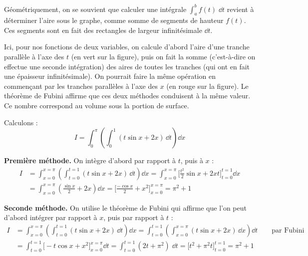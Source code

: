 \documentclass[class=report,crop=false]{standalone}
\begin{document}
Géométriquement, on se souvient que calculer une intégrale $\int_a^b f(t)\;\dd t$
revient à déterminer l'aire sous le graphe, comme somme de segments de hauteur $f(t)$.
Ces segments sont en fait des rectangles de largeur infinitésimale $\dd t$.




Ici, pour nos fonctions de deux variables, on calcule d'abord l'aire d'une 
tranche parallèle à l'axe des $t$ (en vert sur la figure), 
puis on fait la somme (c'est-à-dire on effectue une seconde intégration) 
des aires de toutes les tranches (qui ont en fait une épaisseur infinitésimale).
On pourrait faire la même opération en commençant par les tranches parallèles 
à l'axe des $x$ (en rouge sur la figure).
Le théorème de Fubini affirme que ces deux méthodes conduisent à la même valeur.
Ce nombre correspond au volume sous la portion de surface.




\begin{exemple}
Calculons :
$$I = \int_0^\pi \left( \int_0^1 (t\sin x + 2x)\, \dd t\right)\dd x$$

\textbf{Première méthode.} On intègre d'abord par rapport à $t$, puis à $x$ :
\begin{align*}
I 
& = \int_{x=0}^{x=\pi} \left( \int_{t=0}^{t=1} (t\sin x +2x)\, \dd t\right)\dd x  
 = \int_{x=0}^{x=\pi} \Big[ \frac{t^2}{2}\sin x + 2xt  \Big]_{t=0}^{t=1} \dd x  \\
& = \int_{x=0}^{x=\pi} \left( \frac{\sin x}{2} + 2x \right) \dd x  
 = \Big[ \frac{-\cos x}{2} + x^2  \Big]_{x=0}^{x=\pi} 
 = \pi^2+1 
\end{align*}

\medskip
\textbf{Seconde méthode.} On utilise le théorème de Fubini qui affirme que l'on peut 
d'abord intégrer par rapport à $x$, puis par rapport à $t$ :
\begin{align*}
I 
& = \int_{x=0}^{x=\pi} \left( \int_{t=0}^{t=1} (t\sin x +2x)\, \dd t\right)\dd x  
 = \int_{t=0}^{t=1} \left(\int_{x=0}^{x=\pi}  (t\sin x +2x)\, \dd x\right)\dd t \qquad \text{par Fubini} \\
& = \int_{t=0}^{t=1} \Big[-t\cos x + x^2\Big]_{x=0}^{x=\pi} \dd t 
 = \int_{t=0}^{t=1} (2t+\pi^2)\; \dd t 
 = \Big[ t^2 + \pi^2 t\Big]_{t=0}^{t=1} 
 = \pi^2+1 
\end{align*}
\end{exemple}
\end{document}
